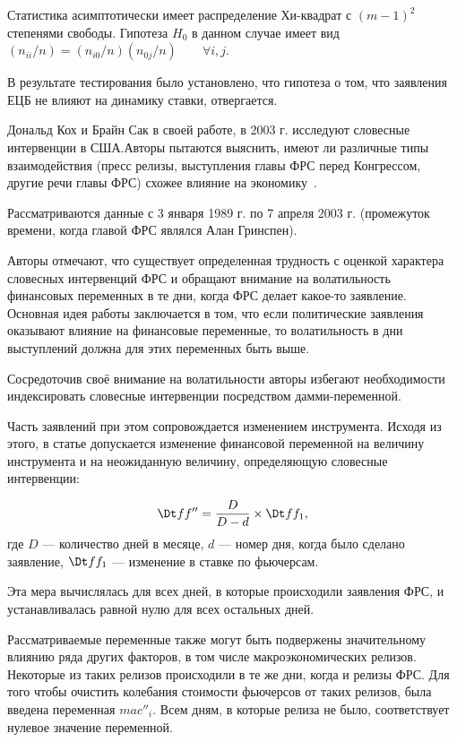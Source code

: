 \documentclass[14pt,a4paper, oneside]{extreport}
\begin{document}
Статистика  асимптотически имеет распределение Хи-квадрат с $(m-1)^2$ степенями свободы. Гипотеза $H_0$ в данном случае имеет вид $(n_{ii}/n) = (n_{i0}/n)(n_{0j}/n) \qquad \forall i,j$. 

В результате тестирования было установлено, что гипотеза о том, что заявления ЕЦБ не влияют на динамику ставки, отвергается. 

Дональд Кох и Брайн Сак в своей работе, в 2003 г. исследуют словесные интервенции в США.Авторы пытаются выяснить, имеют ли различные типы взаимодействия (пресс релизы, выступления главы ФРС перед Конгрессом, другие речи главы ФРС) схожее влияние на экономику~\cite{kohn2003central}.

Рассматриваются данные с 3 января 1989 г. по 7 апреля 2003 г. (промежуток времени, когда главой ФРС являлся Алан Гринспен). 

Авторы отмечают, что существует определенная трудность с оценкой характера словесных интервенций ФРС и обращают внимание на волатильность финансовых переменных в те дни, когда ФРС делает какое-то заявление. Основная идея работы заключается в том, что если политические заявления оказывают влияние на финансовые переменные, то волатильность в дни выступлений должна для этих переменных быть выше. 

Сосредоточив своё внимание на волатильности авторы избегают необходимости индексировать словесные интервенции посредством дамми-переменной. 

Часть заявлений при этом сопровождается изменением инструмента. Исходя из этого, в статье допускается изменение финансовой переменной на величину инструмента и на неожиданную величину, определяющую словесные интервенции: 

\begin{equation}
\Dt ff'' = \frac{D}{D-d} \times \Dt ff_1,
\end{equation} где $D$ --- количество дней в месяце, $d$ --- номер дня, когда было сделано заявление, $\Dt ff_1$ --- изменение в ставке по фьючерсам.

Эта мера вычислялась для всех дней, в которые происходили заявления ФРС, и устанавливалась равной нулю для всех остальных дней.  

Рассматриваемые переменные также могут быть подвержены значительному влиянию ряда других факторов, в том числе макроэкономических релизов. Некоторые из таких релизов происходили в те же дни, когда и релизы ФРС. Для того чтобы очистить колебания стоимости фьючерсов от таких релизов, была введена переменная $mac''_i$.  Всем дням, в которые релиза не было, соответствует нулевое значение переменной. 
\end{document}
